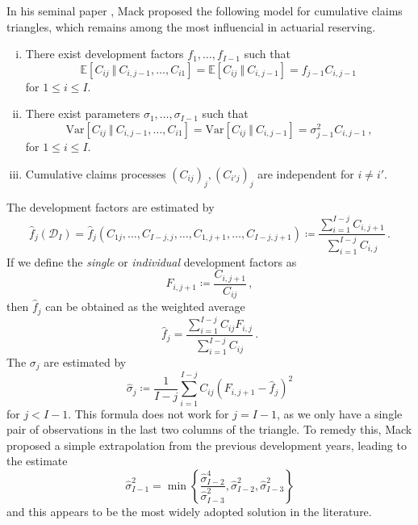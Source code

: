 \documentclass[a4paper]{book}
\begin{document}
In his seminal paper \cite{mack:chain-ladder}, Mack proposed the following model for cumulative claims triangles, which remains among the most influencial in actuarial reserving.
\begin{model} \label{model:mack} \leavevmode
    \begin{enumerate}[(i)]
        \item There exist development factors $f_1, \dots, f_{I - 1}$ such that
        \begin{equation} \label{eq:mack-expectation}
            \mathbb{E}[C_{ij} \ \Vert \ C_{i, j - 1}, \dots, C_{i1}] = \mathbb{E}[C_{ij} \ \Vert \ C_{i, j - 1}] = f_{j - 1} C_{i, j - 1}\,
        \end{equation}
        for $1 \leq i \leq I$.
        \item There exist parameters $\sigma_1, \dots, \sigma_{I - 1}$ such that
        \begin{equation} \label{eq:mack-variance}
            \mathrm{Var}[C_{ij} \ \Vert \ C_{i, j - 1}, \dots, C_{i1}] = \mathrm{Var}[C_{ij} \ \Vert \ C_{i, j - 1}] = \sigma_{j - 1}^2 C_{i, j - 1}\,,
        \end{equation}
        for $1 \leq i \leq I$.
        \item Cumulative claims processes $(C_{ij})_j, (C_{i'j})_j$ are independent for $i \neq i'$.
    \end{enumerate}
\end{model}
The development factors are estimated by
\begin{equation} \label{eq:devfac-estimator}
    \widehat{f}_j(\mathcal{D}_I) = \widehat{f}_j(C_{1j}, \dots, C_{I - j, j}, \dots, C_{1, j + 1}, \dots, C_{I - j, j + 1}) \coloneqq \frac{\sum_{i = 1}^{I - j} C_{i, j + 1}}{\sum_{i = 1}^{I - j} C_{i, j}} \,.
\end{equation}
If we define the \emph{single} or \emph{individual} development factors as
\begin{equation}
    F_{i, j + 1} \coloneqq \frac{C_{i, j + 1}}{C_{ij}} \,,
\end{equation}
then $\widehat{f}_j$ can be obtained as the weighted average
\begin{equation}
  \widehat{f}_j = \frac{\sum_{i = 1}^{I - j} C_{ij} F_{i, j}}{\sum_{i = 1}^{I - j} C_{ij}} \,.
\end{equation}
The $\sigma_j$ are estimated by
\begin{equation}
    \widehat{\sigma}_j \coloneqq \frac{1}{I-j}\sum_{i = 1}^{I-j} C_{ij}\left( F_{i, j + 1} - \widehat{f}_j \right)^2
\end{equation}
for $j < I - 1$. This formula does not work for $j = I - 1$, as we only have a single pair of observations in the last two columns of the triangle. To remedy this, Mack proposed a simple extrapolation from the previous development years, leading to the estimate
\begin{equation}
  \widehat{\sigma}^2_{I - 1} = \min{ \left \{ \frac{\widehat{\sigma}^4_{I - 2}}{\widehat{\sigma}^2_{I - 3}}, \widehat{\sigma}^2_{I - 2}, \widehat{\sigma}^2_{I - 3} \right \} }
\end{equation}
and this appears to be the most widely adopted solution in the literature.
\end{document}
